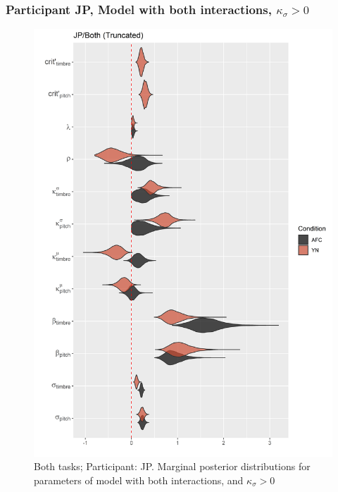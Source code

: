 \documentclass{article}\usepackage{knitr}
\begin{document}
\subsubsection{Participant JP, Model with both interactions, $\kappa_{\sigma} > 0$}

\begin{figure}[H]
\centering
\includegraphics[scale=0.75, angle = 0]{Analysis_of_Human_Data/JP_YN_AFC_Both_T}
\caption{Both tasks; Participant: JP. Marginal posterior distributions for parameters of model with both interactions, and $\kappa_{\sigma} > 0$}
\label{fig:JP_YN_AFC_Both_T}
\end{figure}
\end{document}
